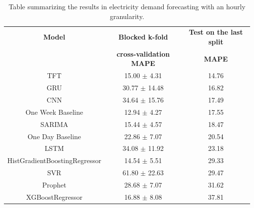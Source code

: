 \begin{table}[H]
\centering
\begin{tabular}{|c|c|c|}
\hline
\textbf{Model} & \textbf{Blocked k-fold} & \textbf{Test on the last split}\\
 & \textbf{cross-validation MAPE} & \textbf{MAPE}\\
\hline
TFT & 15.00 $\pm$ 4.31 & 14.76\\
\hline
GRU & 30.77 $\pm$ 14.48 & 16.82\\
\hline
CNN & 34.64 $\pm$ 15.76 & 17.49\\
\hline
One Week Baseline & 12.94 $\pm$ 4.27 & 17.55\\
\hline
SARIMA & 15.44 $\pm$ 4.57 & 18.47\\
\hline
One Day Baseline & 22.86 $\pm$ 7.07 & 20.54\\
\hline
LSTM & 34.08 $\pm$ 11.92 & 23.18\\
\hline
HistGradientBoostingRegressor & 14.54 $\pm$ 5.51 & 29.33\\
\hline
SVR & 61.80 $\pm$ 22.63 & 29.47\\
\hline
Prophet & 28.68 $\pm$ 7.07 & 31.62\\
\hline
XGBoostRegressor & 16.88 $\pm$ 8.08 & 37.81\\
\hline
\end{tabular}
\caption{Table summarizing the results in electricity demand forecasting with an hourly granularity.}
\label{tab:demandhourlyresults}
\end{table}


